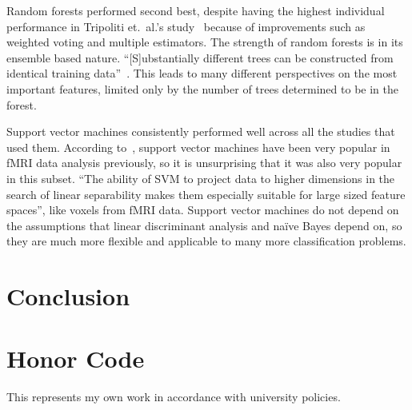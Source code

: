 \documentclass[pageno]{jpaper}
\begin{document}
Random forests performed second best, despite having the highest individual 
performance in Tripoliti et.\ al.'s study~\cite{Tripoliti2010} because of 
improvements such as weighted voting and multiple estimators. The strength of 
random forests is in its ensemble based nature. ``[S]ubstantially different trees
can be constructed from identical training data''~\cite{Armananzas2016}. This 
leads to many different perspectives on the most important features, limited only 
by the number of trees determined to be in the forest.

Support vector machines consistently performed well across all the studies that 
used them. According to~\cite{Armananzas2016}, support vector machines have been 
very popular in fMRI data analysis previously, so it is unsurprising that it was 
also very popular in this subset. ``The ability of SVM to project data to higher 
dimensions in the search of linear separability makes them especially suitable 
for large sized feature spaces'', like voxels from fMRI data. Support vector 
machines do not depend on the assumptions that linear discriminant analysis and 
naïve Bayes depend on, so they are much more flexible and applicable to many 
more classification problems.


\section{Conclusion}


\section{Honor Code}

This represents my own work in accordance with university policies.





\end{document}
